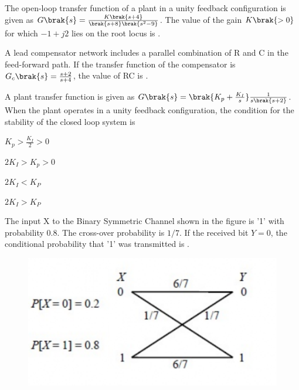     \hfill{}

    \item The open-loop transfer function of a plant in a unity feedback configuration is given as $G\brak{s}=\frac{K\brak{s+4}}{\brak{s+8}\brak{s^{2}-9}}$. The value of the gain $K\brak{>0}$ for which $-1+j2$ lies on the root locus is \underline{\hspace{2cm}}.
    
    \hfill{}

    \item A lead compensator network includes a parallel combination of R and C in the feed-forward path. If the transfer function of the compensator is $G_{c}\brak{s}=\frac{s+2}{s+4}$, the value of RC is \underline{\hspace{2cm}}.
    
    \hfill{}

    \item A plant transfer function is given as $G\brak{s}=\brak{K_{p}+\frac{K_{I}}{s}}\frac{1}{s\brak{s+2}}$. When the plant operates in a unity feedback configuration, the condition for the stability of the closed loop system is
    \begin{enumerate}
        \begin{multicols}{2}
            \item $K_{p}>\frac{K_{I}}{2}>0$
            \item $2K_{I}>K_{p}>0$
            \item $2K_{I}<K_{P}$
            \item $2K_{I}>K_{P}$
        \end{multicols}
    \end{enumerate}
    
    \hfill{}

    \item The input X to the Binary Symmetric Channel  shown in the figure is '1' with probability 0.8. The cross-over probability is $1/7$. If the received bit $Y=0$, the conditional probability that '1' was transmitted is \underline{\hspace{2cm}}.
    \begin{figure}[H]
        \centering
        \includegraphics[width=0.4\columnwidth]{figs/q59.png}
        \caption*{}
        \label{fig:q59}
    \end{figure}
    
